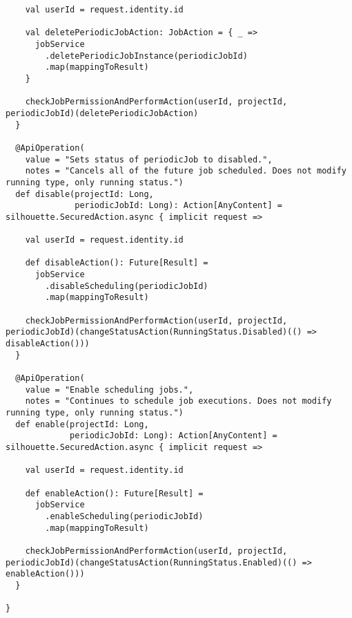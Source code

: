\begin{lstlisting}
    val userId = request.identity.id

    val deletePeriodicJobAction: JobAction = { _ =>
      jobService
        .deletePeriodicJobInstance(periodicJobId)
        .map(mappingToResult)
    }

    checkJobPermissionAndPerformAction(userId, projectId, periodicJobId)(deletePeriodicJobAction)
  }

  @ApiOperation(
    value = "Sets status of periodicJob to disabled.",
    notes = "Cancels all of the future job scheduled. Does not modify running type, only running status.")
  def disable(projectId: Long,
              periodicJobId: Long): Action[AnyContent] = silhouette.SecuredAction.async { implicit request =>

    val userId = request.identity.id

    def disableAction(): Future[Result] =
      jobService
        .disableScheduling(periodicJobId)
        .map(mappingToResult)

    checkJobPermissionAndPerformAction(userId, projectId, periodicJobId)(changeStatusAction(RunningStatus.Disabled)(() => disableAction()))
  }

  @ApiOperation(
    value = "Enable scheduling jobs.",
    notes = "Continues to schedule job executions. Does not modify running type, only running status.")
  def enable(projectId: Long,
             periodicJobId: Long): Action[AnyContent] = silhouette.SecuredAction.async { implicit request =>

    val userId = request.identity.id

    def enableAction(): Future[Result] =
      jobService
        .enableScheduling(periodicJobId)
        .map(mappingToResult)

    checkJobPermissionAndPerformAction(userId, projectId, periodicJobId)(changeStatusAction(RunningStatus.Enabled)(() => enableAction()))
  }

}
\end{lstlisting}
